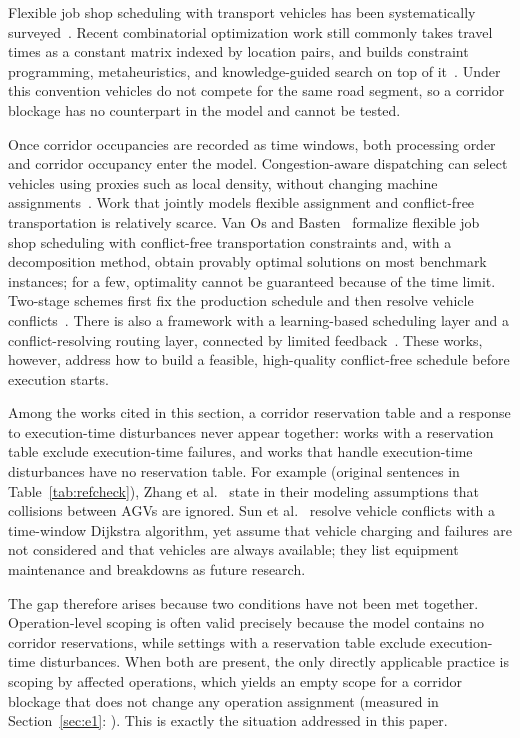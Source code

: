 Flexible job shop scheduling with transport vehicles has been systematically surveyed~\cite{xin2025review}.
Recent combinatorial optimization work still commonly takes travel times as a constant matrix indexed by location pairs,
and builds constraint programming, metaheuristics, and knowledge-guided search on top of it~\cite{meng2025cp,qin2026knowledge,fu2025integrated}.
Under this convention vehicles do not compete for the same road segment, so a corridor blockage has no counterpart in the model and cannot be tested.

Once corridor occupancies are recorded as time windows, both processing order and corridor occupancy enter the model.
Congestion-aware dispatching can select vehicles using proxies such as local density, without changing machine assignments~\cite{kim2026congestion}.
Work that jointly models flexible assignment and conflict-free transportation is relatively scarce.
Van Os and Basten~\cite{vanos2026exact} formalize flexible job shop scheduling with conflict-free transportation constraints
and, with a decomposition method, obtain provably optimal solutions on most benchmark instances; for a few, optimality cannot be guaranteed because of the time limit.
Two-stage schemes first fix the production schedule and then resolve vehicle conflicts~\cite{sun2023integrated}.
There is also a framework with a learning-based scheduling layer and a conflict-resolving routing layer, connected by limited feedback~\cite{li2026framework}.
These works, however, address how to build a feasible, high-quality conflict-free schedule before execution starts.

Among the works cited in this section, a corridor reservation table and a response to execution-time disturbances never appear together: works with a reservation table exclude execution-time failures,
and works that handle execution-time disturbances have no reservation table.
For example (original sentences in Table~\ref{tab:refcheck}),
Zhang et al.~\cite{zhang2023energy} state in their modeling assumptions that collisions between AGVs are ignored.
Sun et al.~\cite{sun2023integrated}
resolve vehicle conflicts with a time-window Dijkstra algorithm, yet assume that vehicle charging and failures are not considered and that vehicles are always available;
they list equipment maintenance and breakdowns as future research.

The gap therefore arises because two conditions have not been met together.
Operation-level scoping is often valid precisely because the model contains no corridor reservations, while settings with a reservation table exclude execution-time disturbances.
When both are present, the only directly applicable practice is scoping by affected operations,
which yields an empty scope for a corridor blockage that does not change any operation assignment (measured in Section~\ref{sec:e1}: \PassMiss).
This is exactly the situation addressed in this paper.


